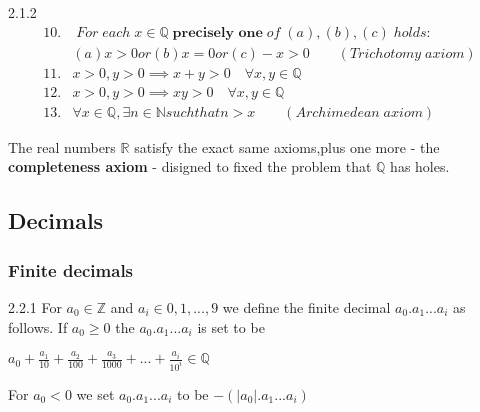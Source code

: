 \documentclass[a4paper]{article}
\begin{document}
\begin{axioms}{2.1.2}{}
    \begin{align*}
        10.&\;For \;each \; x\in \mathbb{Q}\; \textbf{precisely one} \;of \;(a),(b),(c) \;holds:\\  
        &(a)x>0 or (b)x=0 or (c)-x>0   \qquad(Trichotomy \;axiom)\\
        11.& x>0,y>0 \implies x+y>0  \quad\forall x,y \in \mathbb{Q}\\
        12.& x>0,y>0 \implies xy>0  \quad \forall x,y \in \mathbb{Q}\\ 
        13.& \forall x \in \mathbb{Q},\exists n \in \mathbb{N} such that n>x   \qquad(Archimedean \;axiom)
    \end{align*}
\end{axioms}
The real numbers $\mathbb{R}$ satisfy the exact same axioms,plus one more - the \textbf{completeness axiom} - disigned to fixed the problem that $\mathbb{Q}$ has holes.
\subsection{Decimals}
\subsubsection{Finite decimals}
\begin{definition}{2.2.1}{}
    For $a_0 \in \mathbb{Z}$ and $a_i \in {0,1,...,9}$ we define the finite decimal $a_0.a_1...a_i$ as follows. If $a_0 \geq 0$ the $a_0.a_1...a_i$ is set to be\\
    \begin{center}
        $a_0+\frac{a_1}{10}+\frac{a_2}{100}+\frac{a_3}{1000}+...+\frac{a_i}{10^i} \in \mathbb{Q}$
    \end{center}
    For $a_0<0$ we set $a_0.a_1...a_i$ to be $- (\vert a_0 \vert.a_1...a_i) $
\end{definition}
\end{document}
